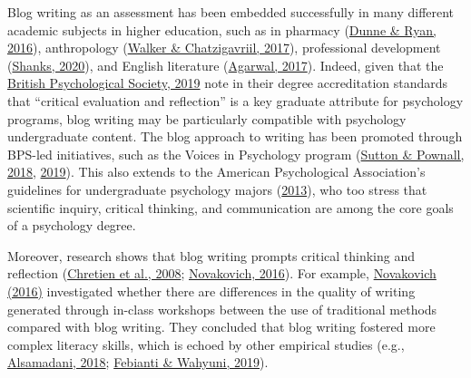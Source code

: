 \documentclass[
  11pt,
  letterpaper,
  oneside,
  open=any]{scrbook}
\begin{document}
Blog writing as an assessment has been embedded successfully in many
different academic subjects in higher education, such as in pharmacy
(\href{https://journals-sagepub-com.gold.idm.oclc.org/doi/full/10.1177/00986283211027278\#bibr20-00986283211027278}{Dunne
\& Ryan, 2016}), anthropology
(\href{https://journals-sagepub-com.gold.idm.oclc.org/doi/full/10.1177/00986283211027278\#bibr67-00986283211027278}{Walker
\& Chatzigavriil, 2017}), professional development
(\href{https://journals-sagepub-com.gold.idm.oclc.org/doi/full/10.1177/00986283211027278\#bibr58-00986283211027278}{Shanks,
2020}), and English literature
(\href{https://journals-sagepub-com.gold.idm.oclc.org/doi/full/10.1177/00986283211027278\#bibr1-00986283211027278}{Agarwal,
2017}). Indeed, given that the
\href{https://journals-sagepub-com.gold.idm.oclc.org/doi/full/10.1177/00986283211027278\#bibr8-00986283211027278}{British
Psychological Society, 2019} note in their degree accreditation
standards that ``critical evaluation and reflection'' is a key graduate
attribute for psychology programs, blog writing may be particularly
compatible with psychology undergraduate content. The blog approach to
writing has been promoted through BPS-led initiatives, such as the
Voices in Psychology program
(\href{https://journals-sagepub-com.gold.idm.oclc.org/doi/full/10.1177/00986283211027278\#bibr60-00986283211027278}{Sutton
\& Pownall, 2018},
\href{https://journals-sagepub-com.gold.idm.oclc.org/doi/full/10.1177/00986283211027278\#bibr61-00986283211027278}{2019}).
This also extends to the American Psychological Association's guidelines
for undergraduate psychology majors
(\href{https://journals-sagepub-com.gold.idm.oclc.org/doi/full/10.1177/00986283211027278\#bibr3-00986283211027278}{2013}),
who too stress that scientific inquiry, critical thinking, and
communication are among the core goals of a psychology degree.

Moreover, research shows that blog writing prompts critical thinking and
reflection
(\href{https://journals-sagepub-com.gold.idm.oclc.org/doi/full/10.1177/00986283211027278\#bibr12-00986283211027278}{Chretien
et al., 2008};
\href{https://journals-sagepub-com.gold.idm.oclc.org/doi/full/10.1177/00986283211027278\#bibr51-00986283211027278}{Novakovich,
2016}). For example,
\href{https://journals-sagepub-com.gold.idm.oclc.org/doi/full/10.1177/00986283211027278\#bibr51-00986283211027278}{Novakovich
(2016)} investigated whether there are differences in the quality of
writing generated through in-class workshops between the use of
traditional methods compared with blog writing. They concluded that blog
writing fostered more complex literacy skills, which is echoed by other
empirical studies (e.g.,
\href{https://journals-sagepub-com.gold.idm.oclc.org/doi/full/10.1177/00986283211027278\#bibr2-00986283211027278}{Alsamadani,
2018};
\href{https://journals-sagepub-com.gold.idm.oclc.org/doi/full/10.1177/00986283211027278\#bibr21-00986283211027278}{Febianti
\& Wahyuni, 2019}).
\end{document}
